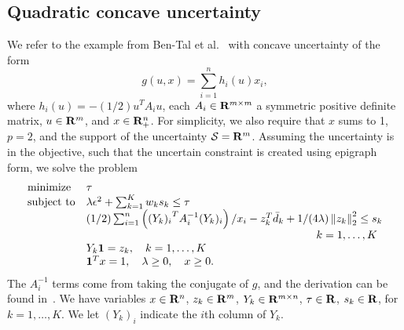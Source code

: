 \documentclass[12pt]{article}
\theoremstyle{thmstyleone}%
\theoremstyle{thmstyletwo}%
\theoremstyle{thmstylethree}%
\begin{document}
\subsection{Quadratic concave uncertainty}
\label{sub:quadraticconcave}
We refer to the example from Ben-Tal et al.~\cite[Section 4.2]{ben-tal_deriving_2015} with concave uncertainty of the form $$g(u,x) = \sum_{i=1}^n h_i(u) x_i,$$ where $h_i(u) = -(1/2)u^TA_iu$, each $A_i\in {\mathbf R}^{m\times m}$ a symmetric positive definite matrix, $u \in {\mathbf R}^m$, and $x \in {\mathbf R}^{n}_{+}$. For simplicity, we also require that $x$ sums to 1, $p = 2$, and the support of the uncertainty $\mathcal{S} = {\mathbf R}^m$. Assuming the uncertainty is in the objective, such that the uncertain constraint is created using epigraph form, we solve the problem
\begin{equation*}
	\begin{array}{ll}
	\text{minimize} & \tau\\
	\text{subject to} & \lambda \epsilon^2 + \sum^{K}_{k=1} w_k s_k \leq \tau\\
	&(1/2)\sum_{i=1}^n \left({(Y_k)_i}^TA_i^{-1}(Y_{k})_i\right)/x_i -z_k^T\bar{d}_k  + 1/(4\lambda) \left\| z_k \right\|^2_2 \leq s_k \\
	&\hspace{7cm} \quad k = 1,\dots,K\\
& Y_{k}\ones = z_k, \quad k = 1,\dots,K\\
	& \ones^T x = 1, \quad \lambda \geq 0,\quad x \geq 0.
	\end{array}
\end{equation*}
The $A_i^{-1}$ terms come from taking the conjugate of $g$, and the derivation can be found in~\cite[Example 24]{ben-tal_deriving_2015}. We have variables $x \in {\mathbf R}^n$, $z_k \in {\mathbf R}^{m}$, $Y_{k} \in {\mathbf R}^{m\times n}$, $\tau \in {\mathbf R}$, $s_k \in {\mathbf R}$, for $k= 1,\dots,K$. We let $(Y_k)_i$ indicate the $i$th column of $Y_k$.
\end{document}
